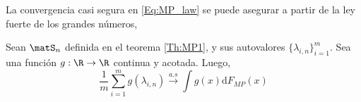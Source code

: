 La convergencia casi segura en \eqref{Eq:MP_law} se puede asegurar a partir de la ley fuerte de los grandes números,
\begin{prop}\label{prop:SLLN}
    Sean $\matS_n$ definida en el teorema \eqref{Th:MP1}, y sus autovalores  $\{\lambda_{i,n}\}_{i=1}^m$. Sea una función $g:\R\to\R$ continua y acotada. Luego,
    \begin{equation}
        \frac{1}{m}\sum_{i=1}^m g(\lambda_{i,n})\xrightarrow[]{a.s} \int g(x)\mathrm{d}F_{MP}(x)
        \label{Eq:SLLN}
    \end{equation}
\end{prop}

